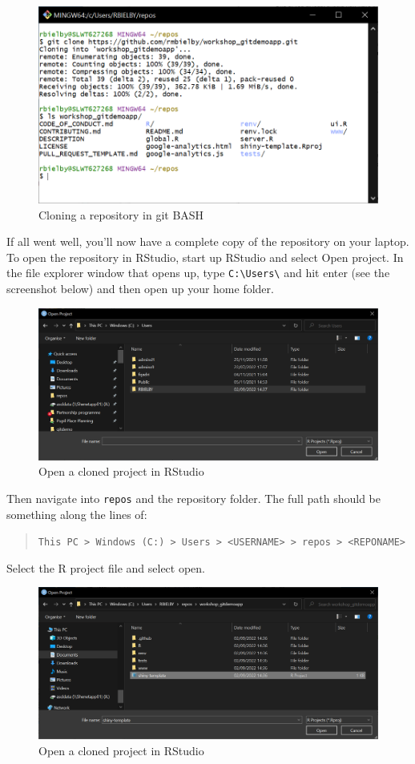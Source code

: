 \documentclass[
  12pt,
]{article}
\begin{document}
\begin{figure}
\includegraphics[width=0.6\linewidth]{images/gitdemo/gitdemo-terminal_clone} \caption{Cloning a repository in git BASH}\label{fig:unnamed-chunk-4}
\end{figure}

If all went well, you'll now have a complete copy of the repository on
your laptop. To open the repository in RStudio, start up RStudio and
select Open project. In the file explorer window that opens up, type
\texttt{C:\textbackslash{}Users\textbackslash{}} and hit enter (see the
screenshot below) and then open up your home folder.

\begin{figure}
\includegraphics[width=0.6\linewidth]{images/gitdemo/gitdemo-RStudio_OpenProj} \caption{Open a cloned project in RStudio}\label{fig:unnamed-chunk-5}
\end{figure}

Then navigate into \texttt{repos} and the repository folder. The full
path should be something along the lines of:

\begin{quote}
\texttt{This\ PC\ \textgreater{}\ Windows\ (C:)\ \textgreater{}\ Users\ \textgreater{}\ \textless{}USERNAME\textgreater{}\ \textgreater{}\ repos\ \textgreater{}\ \textless{}REPONAME\textgreater{}}
\end{quote}

Select the R project file and select open.

\begin{figure}
\includegraphics[width=0.6\linewidth]{images/gitdemo/gitdemo-RStudio_OpenProj_fullpath} \caption{Open a cloned project in RStudio}\label{fig:unnamed-chunk-6}
\end{figure}
\end{document}
